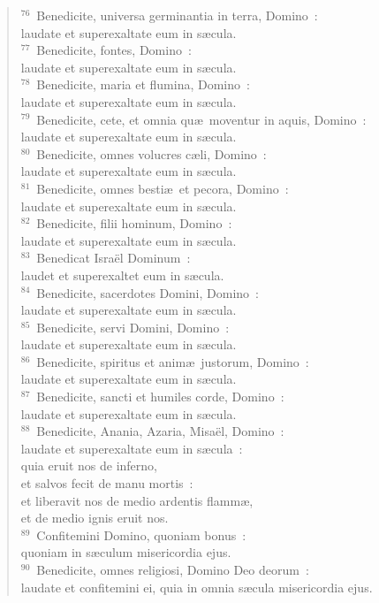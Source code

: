 \begin{flushleft}
\begin{verse}
${}^{76}$~Benedicite, universa germinantia in terra, Domino~:\\ laudate et superexaltate eum in s\ae cula.\\
${}^{77}$~Benedicite, fontes, Domino~:\\ laudate et superexaltate eum in s\ae cula.\\
${}^{78}$~Benedicite, maria et flumina, Domino~:\\ laudate et superexaltate eum in s\ae cula.\\
${}^{79}$~Benedicite, cete, et omnia qu\ae\ moventur in aquis, Domino~:\\ laudate et superexaltate eum in s\ae cula.\\
${}^{80}$~Benedicite, omnes volucres c\ae li, Domino~:\\ laudate et superexaltate eum in s\ae cula.\\
${}^{81}$~Benedicite, omnes besti\ae\ et pecora, Domino~:\\ laudate et superexaltate eum in s\ae cula.\\
${}^{82}$~Benedicite, filii hominum, Domino~:\\ laudate et superexaltate eum in s\ae cula.\\
${}^{83}$~Benedicat Isra\"el Dominum~:\\ laudet et superexaltet eum in s\ae cula.\\
${}^{84}$~Benedicite, sacerdotes Domini, Domino~:\\ laudate et superexaltate eum in s\ae cula.\\
${}^{85}$~Benedicite, servi Domini, Domino~:\\ laudate et superexaltate eum in s\ae cula.\\
${}^{86}$~Benedicite, spiritus et anim\ae\ justorum, Domino~:\\ laudate et superexaltate eum in s\ae cula.\\
${}^{87}$~Benedicite, sancti et humiles corde, Domino~:\\ laudate et superexaltate eum in s\ae cula.\\
${}^{88}$~Benedicite, Anania, Azaria, Misa\"el, Domino~:\\ laudate et superexaltate eum in s\ae cula~:\\ quia eruit nos de inferno,\\ et salvos fecit de manu mortis~:\\ et liberavit nos de medio ardentis flamm\ae ,\\ et de medio ignis eruit nos.\\
${}^{89}$~Confitemini Domino, quoniam bonus~:\\ quoniam in s\ae culum misericordia ejus.\\
${}^{90}$~Benedicite, omnes religiosi, Domino Deo deorum~:\\ laudate et confitemini ei, quia in omnia s\ae cula misericordia ejus.\end{verse}\end{flushleft}


